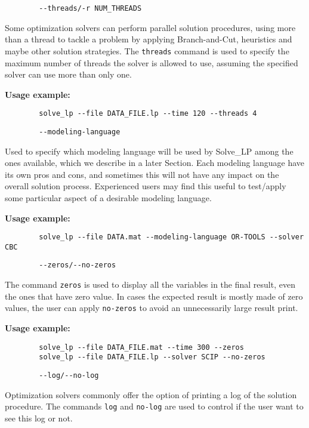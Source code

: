 \documentclass[12pt,hidelinks]{article}
\begin{document}
	{\color{mordantred19}
	\begin{verbatim}
		--threads/-r NUM_THREADS
	\end{verbatim}
	} Some optimization solvers can perform parallel solution procedures, using more than a thread to tackle a problem by applying Branch-and-Cut, heuristics and maybe other solution strategies. The \texttt{threads} command is used to specify the maximum number of threads the solver is allowed to use, assuming the specified solver can use more than only one.
	
	\textbf{Usage example:} 
	\begin{verbatim}
		solve_lp --file DATA_FILE.lp --time 120 --threads 4
	\end{verbatim}

	{\color{mordantred19}
	\begin{verbatim}
		--modeling-language
	\end{verbatim}
	} Used to specify which modeling language will be used by Solve\_LP among the ones available, which we describe in a later Section. Each modeling language have its own pros and cons, and sometimes this will not have any impact on the overall solution process. Experienced users may find this useful to test/apply some particular aspect of a desirable modeling language.
	
	\textbf{Usage example:} 
	\begin{verbatim}
		solve_lp --file DATA.mat --modeling-language OR-TOOLS --solver CBC
	\end{verbatim}

	{\color{mordantred19}
	\begin{verbatim}
		--zeros/--no-zeros
	\end{verbatim}
	} The command \texttt{zeros} is used to display all the variables in the final result, even the ones that have zero value. In cases the expected result is mostly made of zero values, the user can apply \texttt{no-zeros} to avoid an unnecessarily large result print.
	
	\textbf{Usage example:} 
	\begin{verbatim}
		solve_lp --file DATA_FILE.mat --time 300 --zeros
		solve_lp --file DATA_FILE.lp --solver SCIP --no-zeros
	\end{verbatim}

	{\color{mordantred19}
	\begin{verbatim}
		--log/--no-log
	\end{verbatim}
	} Optimization solvers commonly offer the option of printing a log of the solution procedure. The commands \texttt{log} and \texttt{no-log} are used to control if the user want to see this log or not.
	
\end{document}
